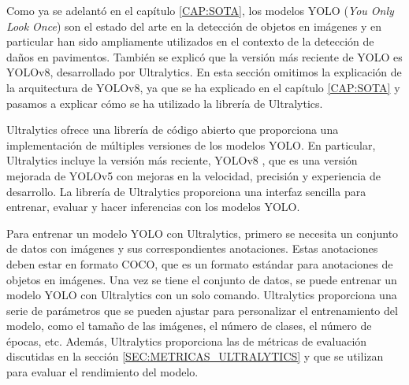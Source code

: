 Como ya se adelantó en el capítulo \ref{CAP:SOTA}, los modelos YOLO (\textit{You Only Look Once}) son el estado del arte en la detección de objetos en imágenes y en particular han sido ampliamente utilizados en el contexto de la detección de daños en pavimentos. También se explicó que la versión más reciente de YOLO es YOLOv8, desarrollado por Ultralytics. En esta sección omitimos la explicación de la arquitectura de YOLOv8, ya que se ha explicado en el capítulo \ref{CAP:SOTA} y pasamos a explicar cómo se ha utilizado la librería de Ultralytics.

Ultralytics ofrece una librería de código abierto que proporciona una implementación de múltiples versiones de los modelos YOLO. En particular, Ultralytics incluye la versión más reciente, YOLOv8 \cite{yolov8_ultralytics}, que es una versión mejorada de YOLOv5 con mejoras en la velocidad, precisión y experiencia de desarrollo. La librería de Ultralytics proporciona una interfaz sencilla para entrenar, evaluar y hacer inferencias con los modelos YOLO.

Para entrenar un modelo YOLO con Ultralytics, primero se necesita un conjunto de datos con imágenes y sus correspondientes anotaciones. Estas anotaciones deben estar en formato COCO, que es un formato estándar para anotaciones de objetos en imágenes. Una vez se tiene el conjunto de datos, se puede entrenar un modelo YOLO con Ultralytics con un solo comando. Ultralytics proporciona una serie de parámetros que se pueden ajustar para personalizar el entrenamiento del modelo, como el tamaño de las imágenes, el número de clases, el número de épocas, etc. Además, Ultralytics proporciona las de métricas de evaluación discutidas en la sección \ref{SEC:METRICAS_ULTRALYTICS} y que se utilizan para evaluar el rendimiento del modelo.
